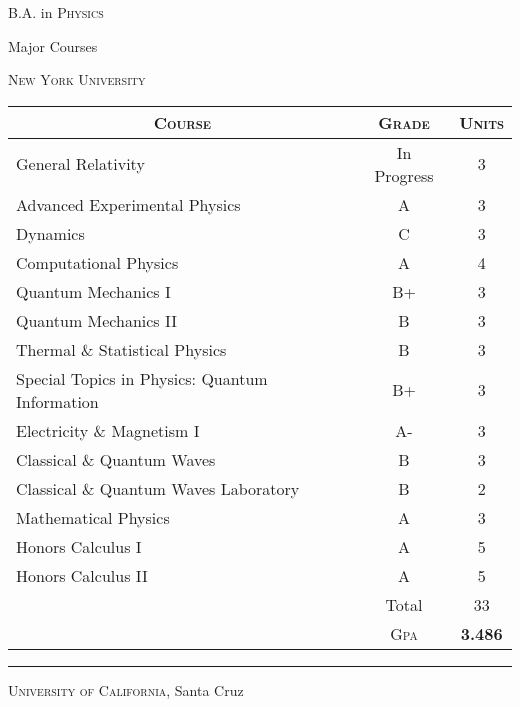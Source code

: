 \documentclass[a4paper,10pt]{article} %
\begin{document}

\newpage


\par{\centering\Large \hypertarget{grds}{B.A. in
    \textsc{Physics}}\par}\large{\centering Major Courses\par}\normalsize
\centering\textsc{New York University}
\begin{center}
\begin{tabular}{lcc}
\multicolumn{1}{c}{\textsc{Course}} & \textsc{Grade}&\textsc{Units}\\ \hline
General Relativity & In Progress & 3 \\
Advanced Experimental Physics & A & 3 \\
Dynamics & C & 3\\
Computational Physics & A & 4\\
Quantum Mechanics I & B+ & 3\\
Quantum Mechanics II & B & 3\\
Thermal \& Statistical Physics & B & 3 \\
Special Topics in Physics: Quantum Information & B+ & 3\\
Electricity \& Magnetism I & A- & 3\\
Classical \& Quantum Waves & B & 3\\
Classical \& Quantum Waves Laboratory & B & 2\\
Mathematical Physics & A & 3\\
Honors Calculus I & A & 5\\
Honors Calculus II & A & 5\\

& Total & 33\\\cline{2-3}
&\textsc{Gpa}&\textbf{3.486}
\end{tabular}
\end{center}
\bigskip
\hrule
\bigskip


\bigskip

\par{\centering\Large\hypertarget{grds_ucsc}{\textsc{University of
    California}, Santa Cruz}}
\end{document}
